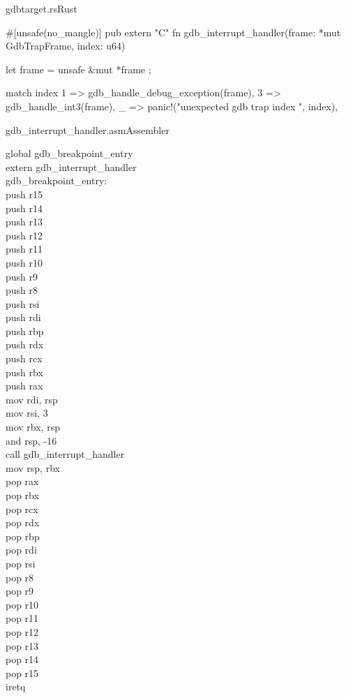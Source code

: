 \begin{codeblock}{gdbtarget.rs}{Rust}
\begin{rustcode}
#[unsafe(no_mangle)]
pub extern "C" fn gdb_interrupt_handler(frame: *mut GdbTrapFrame, index: u64) {
    let frame = unsafe { &mut *frame };

    match index {
        1 => gdb_handle_debug_exception(frame),
        3 => gdb_handle_int3(frame),
        _ => panic!("unexpected gdb trap index {}", index),
    }
}
\end{rustcode}
\end{codeblock}

\begin{codeblock}{gdb\_interrupt\_handler.asm}{Assembler}
\begin{asmcode}
global gdb\_breakpoint\_entry\\
extern gdb\_interrupt\_handler\\

gdb\_breakpoint\_entry:\\
	push r15\\
    	push r14\\
    	push r13\\
    	push r12\\
    	push r11\\
    	push r10\\
    	push r9\\
    	push r8\\
    	push rsi\\
    	push rdi\\
    	push rbp\\
    	push rdx\\
    	push rcx\\
 	push rbx\\
  	push rax\\

    	mov rdi, rsp\\
    	mov rsi, 3\\
    	mov rbx, rsp\\
    	and rsp, -16\\
    	call gdb\_interrupt\_handler\\
    	mov rsp, rbx\\

    	pop rax\\
    	pop rbx\\
    	pop rcx\\
    	pop rdx\\
    	pop rbp\\
    	pop rdi\\
    	pop rsi\\
    	pop r8\\
    	pop r9\\
    	pop r10\\
    	pop r11\\
    	pop r12\\
    	pop r13\\
    	pop r14\\
    	pop r15\\

    	iretq
\end{asmcode}
\end{codeblock}

